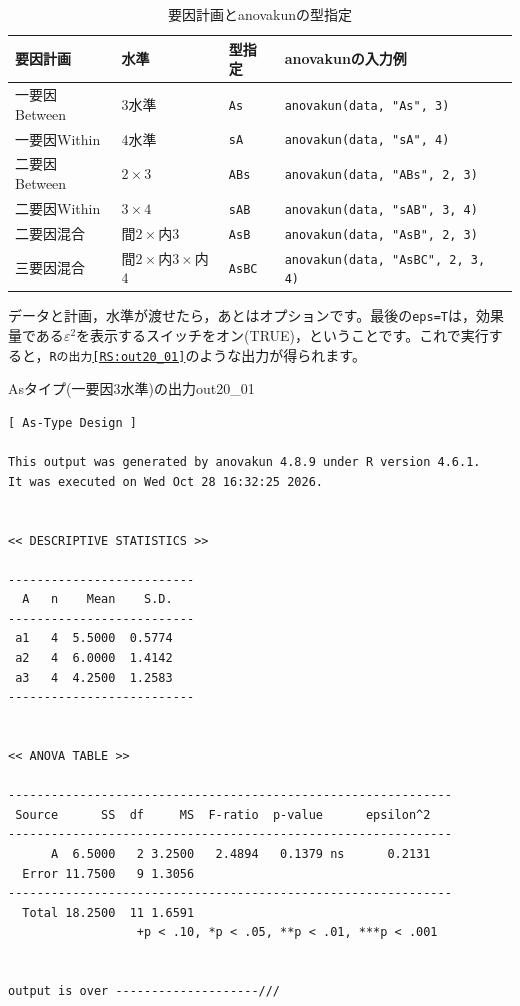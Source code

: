 \documentclass{ltjbook}
\begin{document}
\begin{table}[ht]
        \centering
        \caption{要因計画とanovakunの型指定}
        \label{tbl:20_01}
        \begin{tabular}{llll}
                \hline
                要因計画 & 水準 & 型指定 & anovakunの入力例 \\
                \hline
                一要因Between & 3水準 & \verb|As| & \verb|anovakun(data, "As", 3)| \\
                一要因Within & 4水準 & \verb|sA| & \verb|anovakun(data, "sA", 4)| \\
                二要因Between & $2 \times 3$ & \verb|ABs| & \verb|anovakun(data, "ABs", 2, 3)| \\
                二要因Within & $3 \times 4$ & \verb|sAB| & \verb|anovakun(data, "sAB", 3, 4)| \\
                二要因混合 & 間$2 \times$内$3$ & \verb|AsB| & \verb|anovakun(data, "AsB", 2, 3)| \\
                三要因混合 & 間$2 \times$内$3 \times$内$4$ & \verb|AsBC| & \verb|anovakun(data, "AsBC", 2, 3, 4)| \\
                \hline
        \end{tabular}
\end{table}

データと計画，水準が渡せたら，あとはオプションです。最後の\texttt{eps=T}は，効果量である$\varepsilon^2$を表示するスイッチをオン(TRUE)，ということです。これで実行すると，\texttt{Rの出力\ref{RS:out20_01}}のような出力が得られます。

\begin{Rscreen}{Asタイプ(一要因3水準)の出力}{out20_01}
	\begin{verbatim}
[ As-Type Design ]

This output was generated by anovakun 4.8.9 under R version 4.6.1.
It was executed on Wed Oct 28 16:32:25 2026.

 
<< DESCRIPTIVE STATISTICS >>

--------------------------
  A   n    Mean    S.D. 
--------------------------
 a1   4  5.5000  0.5774 
 a2   4  6.0000  1.4142 
 a3   4  4.2500  1.2583 
--------------------------


<< ANOVA TABLE >>

--------------------------------------------------------------
 Source      SS  df     MS  F-ratio  p-value      epsilon^2 
--------------------------------------------------------------
      A  6.5000   2 3.2500   2.4894   0.1379 ns      0.2131 
  Error 11.7500   9 1.3056                                  
--------------------------------------------------------------
  Total 18.2500  11 1.6591                                  
                  +p < .10, *p < .05, **p < .01, ***p < .001


output is over --------------------///
\end{verbatim}
\end{Rscreen}
\end{document}

